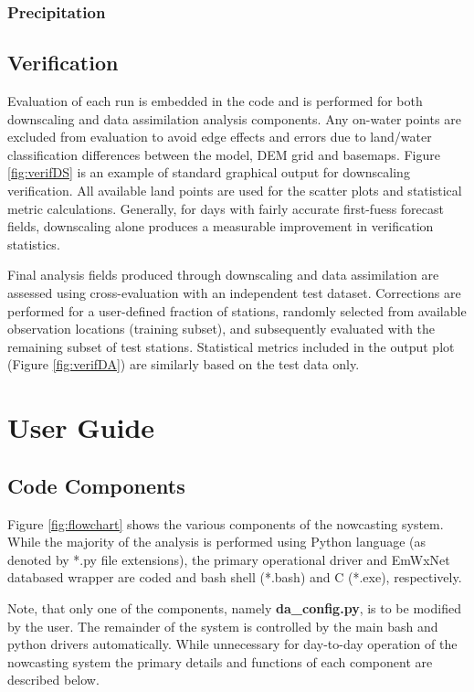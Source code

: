 \documentclass{article}
\begin{document}
\subsubsection{Precipitation}

\FloatBarrier

\subsection{Verification}
Evaluation of each run is embedded in the code and is performed for both downscaling and data assimilation analysis components. Any on-water points are excluded from evaluation to avoid edge effects and errors due to land/water classification differences between the model, DEM grid and basemaps. Figure \ref{fig:verifDS} is an example of standard graphical output for downscaling verification. All available land points are used for the scatter plots and statistical metric calculations. Generally, for days with fairly accurate first-fuess forecast fields, downscaling alone produces a measurable improvement in verification statistics. 

Final analysis fields produced through downscaling and data assimilation are assessed using cross-evaluation with an independent test dataset. Corrections are performed for a user-defined fraction of stations, randomly selected from available observation locations (training subset), and subsequently evaluated with the remaining subset of test stations. Statistical metrics included in the output plot (Figure \ref{fig:verifDA}) are similarly based on the test data only. 

\newpage
\section{User Guide}
\subsection{Code Components}

\FloatBarrier
Figure \ref{fig:flowchart} shows the various components of the nowcasting system. While the majority of the analysis is performed using Python language (as denoted by *.py file extensions), the primary operational driver and EmWxNet databased wrapper are coded and bash shell (*.bash) and C (*.exe), respectively. 

Note, that only one of the components, namely \textbf{da\_config.py}, is to be modified by the user. The remainder of the system is controlled by the main bash and python drivers automatically. While unnecessary for day-to-day operation of the nowcasting system the primary details and functions of each component are described below. 
\end{document}
